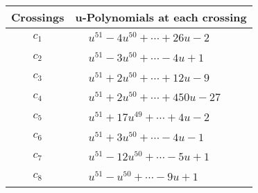 \documentclass[1p]{elsarticle_modified}
\theoremstyle{definition}
\begin{document}
\begin{tabular}{m{50pt}|m{274pt}}
Crossings & \hspace{64pt}u-Polynomials at each crossing \\
\hline $$\begin{aligned}c_{1}\end{aligned}$$&$\begin{aligned}
&u^{51}-4 u^{50}+\cdots+26 u-2
\end{aligned}$\\
\hline $$\begin{aligned}c_{2}\end{aligned}$$&$\begin{aligned}
&u^{51}-3 u^{50}+\cdots-4 u+1
\end{aligned}$\\
\hline $$\begin{aligned}c_{3}\end{aligned}$$&$\begin{aligned}
&u^{51}+2 u^{50}+\cdots+12 u-9
\end{aligned}$\\
\hline $$\begin{aligned}c_{4}\end{aligned}$$&$\begin{aligned}
&u^{51}+2 u^{50}+\cdots+450 u-27
\end{aligned}$\\
\hline $$\begin{aligned}c_{5}\end{aligned}$$&$\begin{aligned}
&u^{51}+17 u^{49}+\cdots+4 u-2
\end{aligned}$\\
\hline $$\begin{aligned}c_{6}\end{aligned}$$&$\begin{aligned}
&u^{51}+3 u^{50}+\cdots-4 u-1
\end{aligned}$\\
\hline $$\begin{aligned}c_{7}\end{aligned}$$&$\begin{aligned}
&u^{51}-12 u^{50}+\cdots-5 u+1
\end{aligned}$\\
\hline $$\begin{aligned}c_{8}\end{aligned}$$&$\begin{aligned}
&u^{51}- u^{50}+\cdots-9 u+1
\end{aligned}$\\

\end{tabular}
\end{document}
